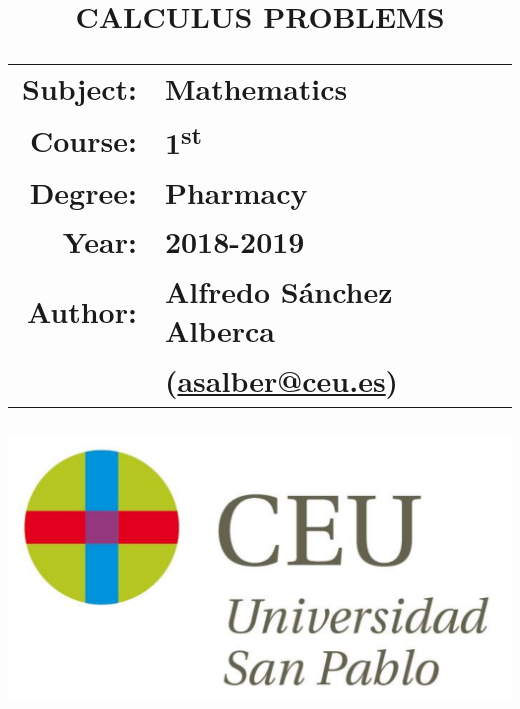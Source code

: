 \documentclass[a4paper,titlepage]{article}
\begin{document}
\sloppy

\title{\vskip 2cm
\Huge \textbf{\textsf{\quad \textcolor{blueceu}{CALCULUS PROBLEMS}\quad}}\\
   \vskip 1cm
\Large \sffamily
\begin{tabular}{rl}
\textcolor{blueceu}{Subject:} & Mathematics\\
\textcolor{blueceu}{Course:} & 1\textsuperscript{st}\\
\textcolor{blueceu}{Degree:} &  Pharmacy\\
\textcolor{blueceu}{Year:} & 2018-2019\\
\textcolor{blueceu}{Author:} & Alfredo S\'anchez Alberca\\  & (\url{asalber@ceu.es})
\end{tabular}
}

\author{}
\date{\includegraphics[scale=0.3]{img/logo_uspceu_01}}

\maketitle
\newpage
\tableofcontents
\newpage











\end{document}

